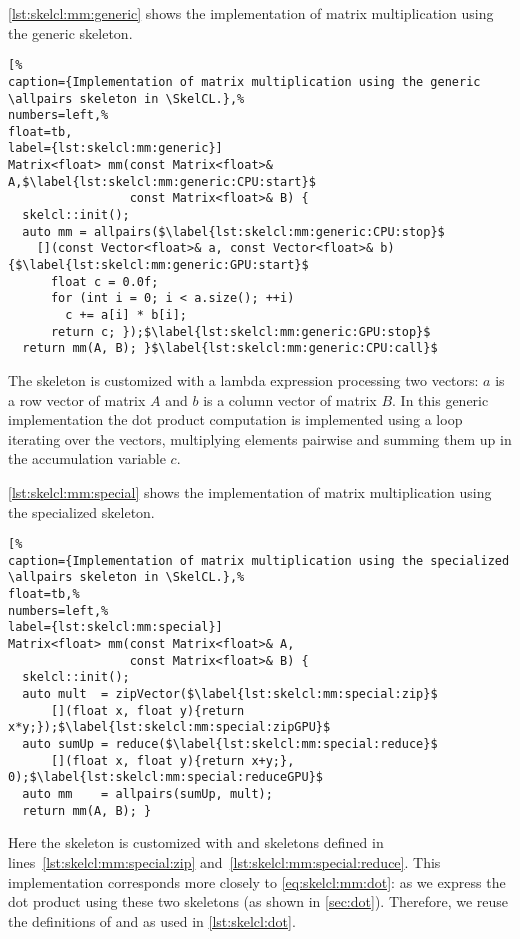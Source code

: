 \autoref{lst:skelcl:mm:generic} shows the implementation of matrix multiplication using the generic \allpairs skeleton.
\begin{lstlisting}[%                                                             
caption={Implementation of matrix multiplication using the generic \allpairs skeleton in \SkelCL.},%
numbers=left,%
float=tb,
label={lst:skelcl:mm:generic}]
Matrix<float> mm(const Matrix<float>& A,$\label{lst:skelcl:mm:generic:CPU:start}$
                 const Matrix<float>& B) {
  skelcl::init();
  auto mm = allpairs($\label{lst:skelcl:mm:generic:CPU:stop}$
    [](const Vector<float>& a, const Vector<float>& b) {$\label{lst:skelcl:mm:generic:GPU:start}$
      float c = 0.0f;
      for (int i = 0; i < a.size(); ++i)
        c += a[i] * b[i];
      return c; });$\label{lst:skelcl:mm:generic:GPU:stop}$
  return mm(A, B); }$\label{lst:skelcl:mm:generic:CPU:call}$
\end{lstlisting}
The skeleton is customized with a lambda expression processing two vectors:
$a$ is a row vector of matrix $A$ and $b$ is a column vector of matrix $B$.
In this generic implementation the dot product computation is implemented using a  loop iterating over the vectors, multiplying elements pairwise and summing them up in the accumulation variable $c$.

\autoref{lst:skelcl:mm:special} shows the implementation of matrix multiplication using the specialized \allpairs skeleton.
\begin{lstlisting}[%                                                             
caption={Implementation of matrix multiplication using the specialized \allpairs skeleton in \SkelCL.},%
float=tb,%                                                                       
numbers=left,%
label={lst:skelcl:mm:special}]
Matrix<float> mm(const Matrix<float>& A,
                 const Matrix<float>& B) {
  skelcl::init();
  auto mult  = zipVector($\label{lst:skelcl:mm:special:zip}$
      [](float x, float y){return x*y;});$\label{lst:skelcl:mm:special:zipGPU}$
  auto sumUp = reduce($\label{lst:skelcl:mm:special:reduce}$
      [](float x, float y){return x+y;}, 0);$\label{lst:skelcl:mm:special:reduceGPU}$
  auto mm    = allpairs(sumUp, mult);
  return mm(A, B); }
\end{lstlisting}
Here the \allpairs skeleton is customized with \zip and \reduce skeletons defined in lines~\ref{lst:skelcl:mm:special:zip} and~\ref{lst:skelcl:mm:special:reduce}.
This implementation corresponds more closely to \autoref{eq:skelcl:mm:dot}:
as we express the dot product using these two skeletons (as shown in \autoref{sec:dot}).
Therefore, we reuse the definitions of  and  as used in \autoref{lst:skelcl:dot}.

